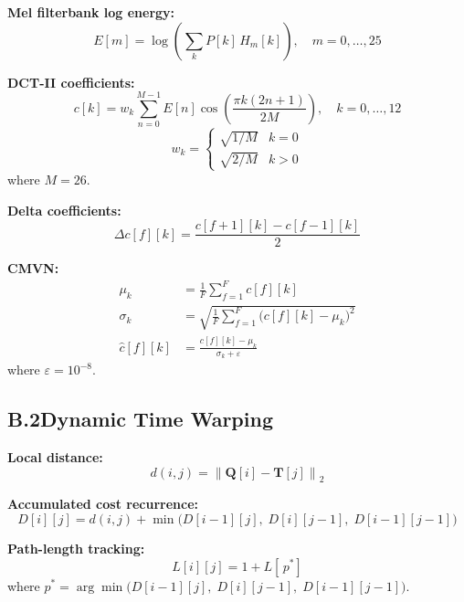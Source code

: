 \documentclass[conference]{IEEEtran}
\begin{document}
\textbf{Mel filterbank log energy:}
\begin{equation}
  E[m] = \log\!\left(\sum_{k} P[k]\,H_m[k]\right),
  \quad m = 0,\ldots,25
  \label{eq:melbank}
\end{equation}

\textbf{DCT-II coefficients:}
\begin{equation}
  c[k] = w_k \sum_{n=0}^{M-1} E[n]
         \cos\!\left(\frac{\pi k (2n+1)}{2M}\right),
  \quad k = 0,\ldots,12
  \label{eq:dct}
\end{equation}
\begin{equation}
  w_k = \begin{cases} \sqrt{1/M} & k=0 \\ \sqrt{2/M} & k>0 \end{cases}
  \label{eq:dctweight}
\end{equation}
where $M = 26$.

\textbf{Delta coefficients:}
\begin{equation}
  \Delta c[f][k] = \frac{c[f{+}1][k] - c[f{-}1][k]}{2}
  \label{eq:delta}
\end{equation}

\textbf{CMVN:}
\begin{align}
  \mu_k     &= \frac{1}{F}\sum_{f=1}^{F} c[f][k] \label{eq:mean}\\
  \sigma_k  &= \sqrt{\frac{1}{F}\sum_{f=1}^{F}
               \bigl(c[f][k]-\mu_k\bigr)^2} \label{eq:std}\\
  \hat{c}[f][k] &= \frac{c[f][k] - \mu_k}{\sigma_k + \varepsilon}
  \label{eq:cmvn}
\end{align}
where $\varepsilon = 10^{-8}$.

\subsection*{B.2\quad Dynamic Time Warping}

\textbf{Local distance:}
\begin{equation}
  d(i,j) = \left\|\mathbf{Q}[i] - \mathbf{T}[j]\right\|_2
  \label{eq:euclid}
\end{equation}

\textbf{Accumulated cost recurrence:}
\begin{equation}
  D[i][j] = d(i,j) + \min\bigl(D[i{-}1][j],\;
             D[i][j{-}1],\; D[i{-}1][j{-}1]\bigr)
  \label{eq:dtw}
\end{equation}

\textbf{Path-length tracking:}
\begin{equation}
  L[i][j] = 1 + L[\,p^*]
  \label{eq:pathlen}
\end{equation}
where $p^* = \arg\min\bigl(D[i{-}1][j],\; D[i][j{-}1],\; D[i{-}1][j{-}1]\bigr)$.
\end{document}
